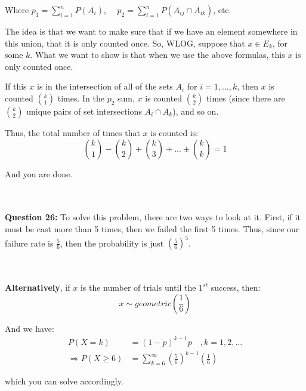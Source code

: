 \documentclass{article}
\begin{document}
    Where $p_1 = \sum\limits_{i=1}^n P(A_i)$, $\quad p_2 = \sum\limits_{i=1}^n P(A_{ij} \cap A_{ik})$, etc.
    
    The idea is that we want to make sure that if we have an element somewhere in this union, that it is only counted once. So, WLOG, suppose that $x \in E_k$, for some $k$. What we want to show is that when we use the above formulas, this $x$ is only counted once. 
    
    If this $x$ is in the intersection of all of the sets $A_i$ for $i = 1,...,k$, then $x$ is counted $k \choose 1$ times. In the $p_2$ sum, $x$ is counted $k \choose 2$ times (since there are $k \choose 2$ unique pairs of set intersections $A_i \cap A_k$), and so on.
    
    Thus, the total number of times that $x$ is counted is:
    \begin{equation*}
        {k \choose 1} - {k \choose 2} + {k \choose 3} + ... \pm {k \choose k} = 1
    \end{equation*}
    
    And you are done.
    
    \\~\\
    
    \noindent \textbf{Question 26:} To solve this problem, there are two ways to look at it. First, if it must be cast more than 5 times, then we failed the first 5 times. Thus, since our failure rate is $\frac{5}{6}$, then the probability is just $\left(\frac{5}{6}\right)^5$. 
    
    \\~\\
    
    \noindent \textbf{Alternatively}, if $x$ is the number of trials until the $1^{st}$ success, then:
    \begin{equation*}
        x \sim geometric \left(\frac{1}{6}\right)
    \end{equation*}
    
    And we have:
    \begin{equation*}
    \begin{split}
        P(X=k) &= (1-p)^{k-1}p \quad , k = 1,2,...\\
       \Rightarrow P(X\geq 6) &= \sum\limits_{k=6}^\infty \left(\frac{5}{6}\right)^{k-1}\left(\frac{1}{6}\right)
    \end{split}
    \end{equation*}
    
    which you can solve accordingly.
    
\end{document}
